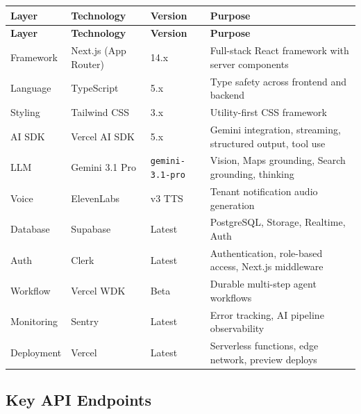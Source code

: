 \documentclass[12pt,a4paper]{article}
\begin{document}
\begin{longtable}{L{2cm} L{3cm} L{2.5cm} L{5.5cm}}
\toprule
\textbf{Layer} & \textbf{Technology} & \textbf{Version} & \textbf{Purpose} \\
\midrule
\endfirsthead
\toprule
\textbf{Layer} & \textbf{Technology} & \textbf{Version} & \textbf{Purpose} \\
\midrule
\endhead
\bottomrule
\endfoot
Framework & Next.js (App Router) & 14.x & Full-stack React framework with server components \\
\midrule
Language & TypeScript & 5.x & Type safety across frontend and backend \\
\midrule
Styling & Tailwind CSS & 3.x & Utility-first CSS framework \\
\midrule
AI SDK & Vercel AI SDK & 5.x & Gemini integration, streaming, structured output, tool use \\
\midrule
LLM & Gemini 3.1 Pro & \texttt{gemini-3.1-pro} & Vision, Maps grounding, Search grounding, thinking \\
\midrule
Voice & ElevenLabs & v3 TTS & Tenant notification audio generation \\
\midrule
Database & Supabase & Latest & PostgreSQL, Storage, Realtime, Auth \\
\midrule
Auth & Clerk & Latest & Authentication, role-based access, Next.js middleware \\
\midrule
Workflow & Vercel WDK & Beta & Durable multi-step agent workflows \\
\midrule
Monitoring & Sentry & Latest & Error tracking, AI pipeline observability \\
\midrule
Deployment & Vercel & Latest & Serverless functions, edge network, preview deploys \\
\end{longtable}

\subsection{Key API Endpoints}
\end{document}

